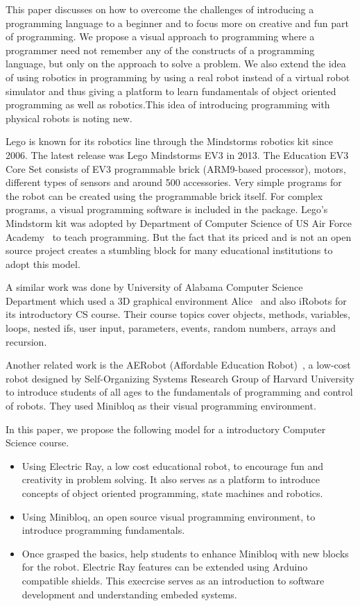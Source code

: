 \documentclass[conference]{IEEEtran}
\begin{document}
This paper discusses on how to overcome the challenges of introducing a programming language to a beginner and to focus more on creative and fun part of programming. We propose a visual approach to programming where a programmer need not remember any of the constructs of a programming language, but only on the approach to solve a problem. We also extend the idea of using robotics in programming by using a real robot instead of a virtual robot simulator and thus giving a platform to learn fundamentals of object oriented programming as well as robotics.This idea of introducing programming with physical robots is noting new.

Lego is known for its robotics line through the Mindstorms robotics kit since 2006. The latest release was Lego Mindstorms EV3 in 2013. The Education EV3 Core Set consists of EV3 programmable brick (ARM9-based processor), motors, different types of sensors and around 500 accessories. Very simple programs for the robot can be created using the programmable brick itself. For complex programs, a visual programming software is included in the package. Lego's Mindstorm kit was adopted by Department of Computer Science of US Air Force Academy~\cite{lego} to teach programming. But the fact that its priced and is not an open source project creates a stumbling block for many educational institutions to adopt this model.

A similar work was done by University of Alabama Computer Science Department which used a 3D graphical environment Alice~\cite{alice} and also iRobots for its introductory CS course. Their course topics cover objects, methods, variables, loops, nested ifs, user input, parameters, events, random numbers, arrays and recursion. 

Another related work is the AERobot (Affordable Education Robot)~\cite{aerobot}, a low-cost robot designed by Self-Organizing Systems Research Group of Harvard University to introduce students of all ages to the fundamentals of programming and control of robots. They used Minibloq as their visual programming environment.

In this paper, we propose the following model for a introductory Computer Science course.

\begin{itemize}

\item Using Electric Ray, a low cost educational robot, to encourage fun and creativity in problem solving. It also serves as a platform to introduce concepts of object oriented programming, state machines and robotics.

\item Using Minibloq, an open source visual programming environment, to introduce programming fundamentals.

\item Once grasped the basics, help students to enhance Minibloq with new blocks for the robot. Electric Ray features can be extended using Arduino compatible shields. This execrcise serves as an introduction to software development and understanding embeded systems.

\end{itemize}
\end{document}
